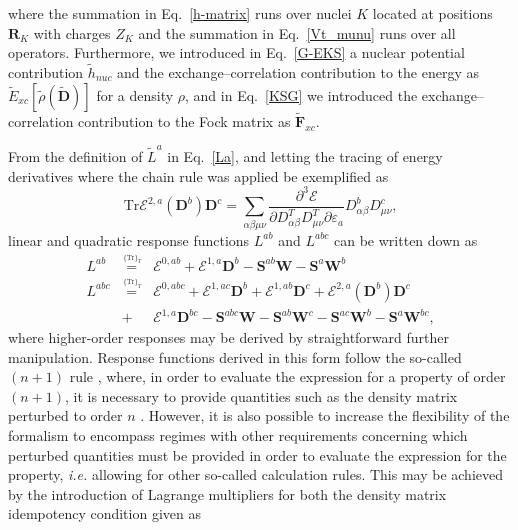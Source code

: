 \documentclass[%
 reprint,
 amsmath,amssymb,
 aps,
]{revtex4-1}
\begin{document}
where the summation in Eq.~\eqref{h-matrix} runs over nuclei $K$ located at positions $\mathbf{R}_{K}$ with charges $Z_{K}$ and the summation in Eq.~\eqref{Vt_munu} runs over all  operators. Furthermore, we introduced in Eq.~\eqref{G-EKS} a nuclear potential contribution $\tilde{h}_{nuc}$ and the exchange--correlation contribution to the energy as $\tilde{E}_{xc}[\tilde{\rho}(\tilde{\mathbf{D}})]$ for a density $\rho$, and in Eq.~\eqref{KSG} we introduced the exchange--correlation contribution to the Fock matrix as $\tilde{\mathbf{F}}_{xc}$.  

From the definition of $\tilde{L}^{a}$ in Eq.~\eqref{La}, and letting the tracing of energy derivatives where the chain rule was applied be exemplified as
\begin{equation}\label{trEchain}
\text{Tr}\mathcal{E}^{2, a}(\mathbf{D}^{b})\mathbf{D}^{c} = \sum_{\alpha \beta \mu \nu} \frac{\partial^{3} \mathcal{E}}{\partial D^{T}_{\alpha \beta} D^{T}_{\mu \nu} \partial \varepsilon_{a}} D^{b}_{\alpha \beta} D^{c}_{\mu \nu} \text{,}
\end{equation}
linear and quadratic response functions $L^{ab}$ and $L^{abc}$ can be written down as
\begin{eqnarray}
L^{ab} & \stackrel{\,^{\{\mathrm{Tr}\}_T}}{=} &  \mathcal{E}^{0,ab}+\bm{\mathcal{E}}^{1,a}\mathbf{D}^{b}-\mathbf{S}^{ab}\mathbf{W}-\mathbf{S}^{a}\mathbf{W}^{b}\label{QagraD}\\
L^{abc} & \stackrel{\,^{\{\mathrm{Tr}\}_T}}{=} &  \mathcal{E}^{0,abc}+\bm{\mathcal{E}}^{1,ac}\mathbf{D}^{b}+\bm{\mathcal{E}}^{1,ab}\mathbf{D}^{c}+\bm{\mathcal{E}}^{2,a}\!(\mathbf{D}^{b})\mathbf{D}^{c}\nonumber \\
 &+&  \bm{\mathcal{E}}^{1,a}\mathbf{D}^{bc}-\mathbf{S}^{abc}\mathbf{W}-\mathbf{S}^{ab}\mathbf{W}^{c}-\mathbf{S}^{ac}\mathbf{W}^{b}-\mathbf{S}^{a}\mathbf{W}^{bc}\label{QabgraD} \text{,}
\end{eqnarray}
where higher-order responses may be derived by straightforward further manipulation. Response functions derived in this form follow the so-called $(n + 1)$ rule , where, in order to evaluate the expression for a property of order $(n + 1)$, it is necessary to provide quantities such as the density matrix perturbed to order $n$ . However, it is also possible to increase the flexibility of the formalism to encompass regimes with other requirements concerning which perturbed quantities must be provided in order to evaluate the expression for the property, \textit{i.e.} allowing for other so-called calculation rules. This may be achieved by the introduction of Lagrange multipliers for both the density matrix idempotency condition given as
\end{document}
